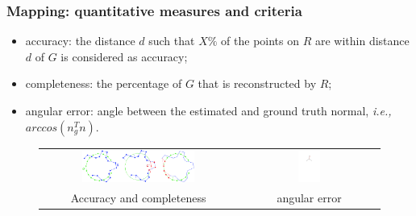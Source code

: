 \documentclass{beamer}
\begin{document}
\begin{frame}
\frametitle{Mapping: quantitative measures and criteria}

\begin{itemize}
\item accuracy: the distance $d$ such that $X\%$ of the points on $R$ are within distance $d$ of $G$ is considered as accuracy;
\item completeness: the percentage of $G$ that is reconstructed by $R$;
\item angular error: angle between the estimated and ground truth normal, \textit{i.e.,} $arccos(n_g^T n)$.
\end{itemize}

\begin{figure}[!htbp]
\begin{tabular}{cc}
\includegraphics[width=0.6\textwidth]{mapping/qm_acc_cmp} &
\includegraphics[width=0.17\textwidth]{mapping/qm_ang_error}\\
Accuracy and completeness & angular error
\end{tabular}
\end{figure}

\end{frame}
\end{document}
